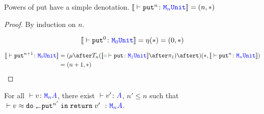 \documentclass{Report}
\newcommand{\zberelation}[3]{\berelation{}{#1}{#2}{#3}}
\newcommand\ztyperelation[2]{\typerelation{}{#1}{#2}}
\renewcommand\put[0]{\texttt{put}}
\newcommand\mna[0]{\M{n}{A}}
\begin{document}
\begin{lemma}
    Powers of put have a simple denotation.
$\deno{\ztyperelation{\put^n}{\M{n}{\U}}} = (n, \singleton)$    
\end{lemma}

\begin{proof}
    By induction on $n$.

    
    \begin{equation}
        \deno{\ztyperelation{\put^0}{\M{0}{\U}}} = \point{}(\singleton) = (0, \singleton)
    \end{equation}
    
    \begin{align}
        \deno{\ztyperelation{\put^{n+1}}{\M{0}{\U}}} & = (\bindmu\after\T{n}{(\deno{\typerelation{\nil}{\put}{\M{1}{\U}}}\after\p)}\after \strengtht)(\singleton, \deno{\ztyperelation{\put^n}{\M{n}{\U}}})\\
        & = (n+1, \singleton)
    \end{align}
\end{proof}

\begin{theorem}
    For all $\ztyperelation{v}{\mna}$, there exist $\ztyperelation{v'}{A}$, $n' \leq n$ such that $\zberelation{v}{\doin{_}{\put^{n'}}{\return{v'}}}{\mna}$.
\end{theorem}
\end{document}

